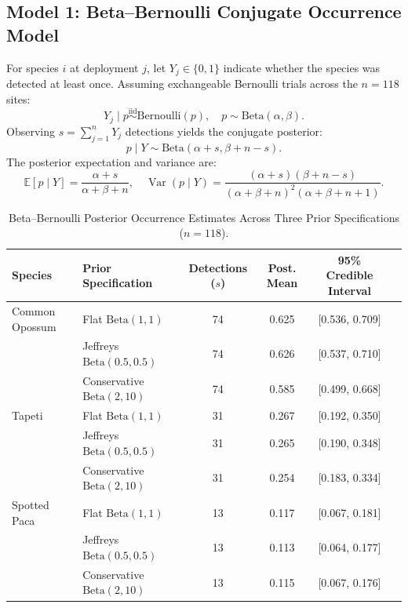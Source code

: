 \documentclass[11pt,a4paper]{article}
\begin{document}
\subsection{Model 1: Beta--Bernoulli Conjugate Occurrence Model}
For species $i$ at deployment $j$, let $Y_j \in \{0, 1\}$ indicate whether the species was detected at least once. Assuming exchangeable Bernoulli trials across the $n = 118$ sites:
\begin{equation}
Y_j \mid p \overset{\text{iid}}{\sim} \text{Bernoulli}(p), \quad p \sim \text{Beta}(\alpha, \beta).
\end{equation}
Observing $s = \sum_{j=1}^n Y_j$ detections yields the conjugate posterior:
\begin{equation}
p \mid Y \sim \text{Beta}(\alpha + s, \beta + n - s).
\end{equation}
The posterior expectation and variance are:
\begin{equation}
\mathbb{E}[p \mid Y] = \frac{\alpha + s}{\alpha + \beta + n}, \quad \operatorname{Var}(p \mid Y) = \frac{(\alpha + s)(\beta + n - s)}{(\alpha + \beta + n)^2 (\alpha + \beta + n + 1)}.
\end{equation}

\begin{table}[H]
\centering
\small
\caption{Beta--Bernoulli Posterior Occurrence Estimates Across Three Prior Specifications ($n = 118$).}
\label{tab:beta_bernoulli}
\begin{tabular}{llcccc}
\toprule
\textbf{Species} & \textbf{Prior Specification} & \textbf{Detections ($s$)} & \textbf{Post. Mean} & \textbf{95\% Credible Interval} \\
\midrule
Common Opossum   & Flat $\text{Beta}(1, 1)$          & 74 & 0.625 & [0.536, 0.709] \\
                 & Jeffreys $\text{Beta}(0.5, 0.5)$  & 74 & 0.626 & [0.537, 0.710] \\
                 & Conservative $\text{Beta}(2, 10)$ & 74 & 0.585 & [0.499, 0.668] \\
\midrule
Tapeti           & Flat $\text{Beta}(1, 1)$          & 31 & 0.267 & [0.192, 0.350] \\
                 & Jeffreys $\text{Beta}(0.5, 0.5)$  & 31 & 0.265 & [0.190, 0.348] \\
                 & Conservative $\text{Beta}(2, 10)$ & 31 & 0.254 & [0.183, 0.334] \\
\midrule
Spotted Paca     & Flat $\text{Beta}(1, 1)$          & 13 & 0.117 & [0.067, 0.181] \\
                 & Jeffreys $\text{Beta}(0.5, 0.5)$  & 13 & 0.113 & [0.064, 0.177] \\
                 & Conservative $\text{Beta}(2, 10)$ & 13 & 0.115 & [0.067, 0.176] \\
\bottomrule
\end{tabular}
\end{table}
\end{document}
